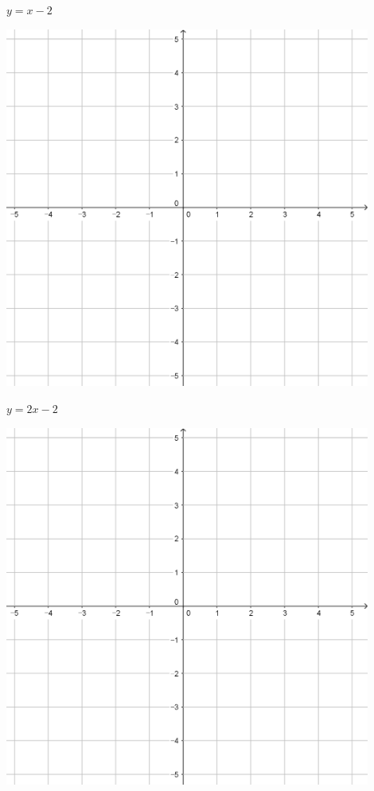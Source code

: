 \documentclass{oblivoir}
\begin{document}
\begin{minipage}{0.45\textwidth}\centering
\(y=x-2\)
\par\bigskip\includegraphics[width=0.9\textwidth]{55}
\end{minipage}
\begin{minipage}{0.45\textwidth}\centering
\(y=2x-2\)
\par\bigskip\includegraphics[width=0.9\textwidth]{55}
\end{minipage}\bigskip\bigskip\par
\end{document}
